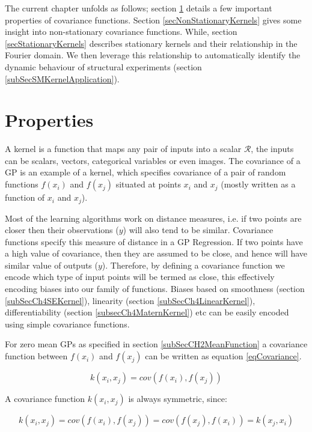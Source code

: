 The current chapter unfolds as follows; section \ref{secPropertiesOfCovariance} details a few important properties of covariance functions. Section \ref{secNonStationaryKernels} gives some insight into non-stationary covariance functions. While, section \ref{secStationaryKernels} describes stationary kernels and their relationship in the Fourier domain. We then leverage this relationship to automatically identify the dynamic behaviour of structural experiments (section \ref{subSecSMKernelApplication}). 

\section{Properties}\label{secPropertiesOfCovariance}
A kernel is a function that maps any pair of inputs into a scalar $\mathcal{R}$, the inputs can be scalars, vectors, categorical variables \cite{villegas2013investigation} or even images. The covariance of a GP is an example of a kernel, which specifies covariance of a pair of random functions $f(x_{i})$ and $f(x_{j})$ situated at points $x_{i}$ and $x_{j}$ (mostly written as a function of $x_{i}$ and $x_{j}$). 

Most of the learning algorithms work on distance measures, i.e. if two points are closer then their observations ($y$) will also tend to be similar. Covariance functions specify this measure of distance in a GP Regression. If two points have a high value of covariance, then they are assumed to be close, and hence will have similar value of outputs ($y$). Therefore, by defining a covariance function we encode which type of input points will be termed as close, this effectively encoding biases into our family of functions. Biases based on smoothness (section \ref{subSecCh4SEKernel}), linearity (section \ref{subSecCh4LinearKernel}), differentiability (section \ref{subsecCh4MaternKernel}) etc can be easily encoded using simple covariance functions.

For zero mean GPs as specified in section \ref{subSecCH2MeanFunction} a covariance function between $f(x_{i})$ and $f(x_{j})$ can be written as equation \ref{eqCovariance}.

\begin{equation}\label{eqCovariance}
    k(x_{i}, x_{j}) = cov(f(x_{i}), f(x_{j}))
\end{equation}

A covariance function $k(x_{i}, x_{j})$ is always symmetric, since: 

\begin{equation}\label{eqSymmetricCovariance}
    k(x_{i}, x_{j}) = cov(f(x_{i}), f(x_{j})) = cov(f(x_{j}), f(x_{i})) =  k(x_{j}, x_{i})
\end{equation}

